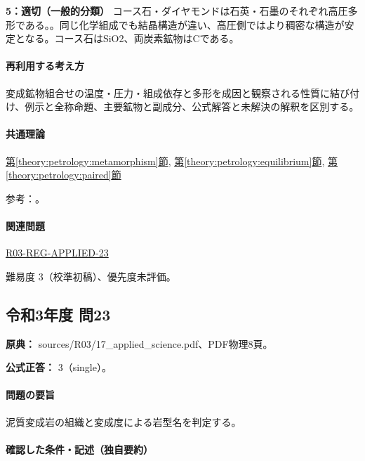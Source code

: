 \noindent\textbf{5：適切（一般的分類）} コース石・ダイヤモンドは石英・石墨のそれぞれ高圧多形である。。同じ化学組成でも結晶構造が違い、高圧側ではより稠密な構造が安定となる。コース石はSiO2、両炭素鉱物はCである。\par

\paragraph{再利用する考え方} 変成鉱物組合せの温度・圧力・組成依存と多形を成因と観察される性質に結び付け、例示と全称命題、主要鉱物と副成分、公式解答と未解決の解釈を区別する。

\paragraph{共通理論} \hyperref[theory:petrology:metamorphism]{第\ref*{theory:petrology:metamorphism}節}, \hyperref[theory:petrology:equilibrium]{第\ref*{theory:petrology:equilibrium}節}, \hyperref[theory:petrology:paired]{第\ref*{theory:petrology:paired}節}

\par 参考：\cite{nelson_assemblages2011,gsj_metamorphic_words,gsj_highpressure2016,hokkaido_polymorph2012}。

\paragraph{関連問題} \hyperref[q:r03-reg-applied-23]{R03-REG-APPLIED-23}

\par 難易度 3（校準初稿）、優先度未評価。

\subsection{令和3年度 問23}
\label{q:r03-reg-applied-23}

\noindent\textbf{原典：} sources/R03/17\_applied\_science.pdf、PDF物理8頁。

\textbf{公式正答：} 3（single）。

\paragraph{問題の要旨} 泥質変成岩の組織と変成度による岩型名を判定する。

\paragraph{確認した条件・記述（独自要約）}\mbox{}\par


